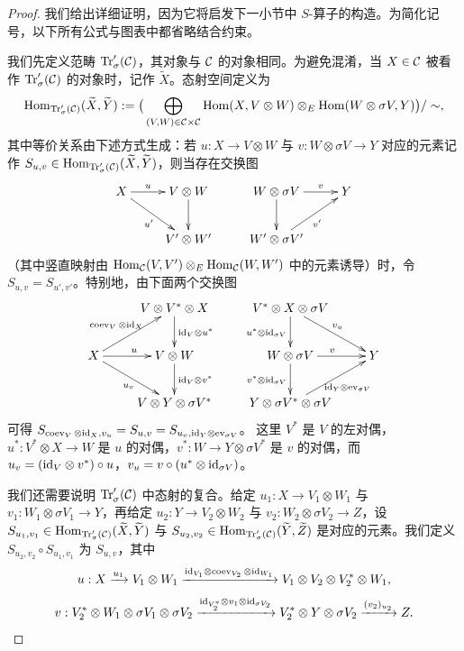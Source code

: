 \begin{proof}
我们给出详细证明，因为它将启发下一小节中 $S$-算子的构造。为简化记号，以下所有公式与图表中都省略结合约束。

我们先定义范畴 ${\operatorname{Tr}}'_\sigma({\mathcal C})$，其对象与 ${\mathcal C}$ 的对象相同。为避免混淆，当 $X\in{\mathcal C}$ 被看作 ${\operatorname{Tr}}'_\sigma({\mathcal C})$ 的对象时，记作 $\widetilde{X}$。态射空间定义为
\begin{equation*}
\label{E:trace hom}
{\operatorname{Hom}}_{{\operatorname{Tr}}'_\sigma({\mathcal C})}(\widetilde{X},\widetilde{Y}):=\big(\bigoplus_{(V,W)\in {\mathcal C}\times {\mathcal C}}{\operatorname{Hom}}(X, V\otimes W)\otimes_E {\operatorname{Hom}}(W\otimes \sigma V, Y)\big)/\sim,
\end{equation*}
其中等价关系由下述方式生成：若 $u: X\to V\otimes W$ 与 $v:W\otimes \sigma V\to Y$ 对应的元素记作 $S_{u,v}\in {\operatorname{Hom}}_{{\operatorname{Tr}}'_\sigma({\mathcal C})}(\widetilde{X},\widetilde{Y})$，则当存在交换图
\[\xymatrix{
X\ar^-{u}[r] \ar_{u'}[dr]& V\otimes W\ar[d] & W\otimes \sigma V\ar[d]\ar^-{v}[r] & Y\\
& V'\otimes W' & W'\otimes \sigma V'\ar_{v'}[ur] &
}\]
（其中竖直映射由 ${\operatorname{Hom}}_{\mathcal C}(V,V')\otimes_E{\operatorname{Hom}}_{{\mathcal C}}(W,W')$ 中的元素诱导）时，令 $S_{u,v}=S_{u',v'}$。特别地，由下面两个交换图
\begin{equation}
\label{E:frac}
\xymatrix{
&V\otimes V^*\otimes X\ar^{\id_V\otimes u^*}[d]& V^*\otimes X\otimes \sigma V\ar^{v_u}[dr]\ar_{u^*\otimes \id_{\sigma V}}[d]&\\
X\ar^{\coev_V\otimes\id_X}[ur]\ar^{u}[r]\ar_{u_v}[dr]&V\otimes W\ar^{\id_V\otimes v^*}[d]&W\otimes \sigma V\ar^{v}[r]\ar_{v^*\otimes\id_{\sigma V}}[d]& Y\\
&V\otimes Y\otimes \sigma V^*& Y\otimes \sigma V^*\otimes \sigma V\ar_{\id_Y\otimes\ev_{\sigma V}}[ur]&
}
\end{equation}
可得 $S_{\operatorname{coev}_V\otimes{\operatorname{id}}_X, v_u}=S_{u,v}=S_{u_v,{\operatorname{id}}_Y\otimes\operatorname{ev}_{\sigma V}}$。
这里 $V^*$ 是 $V$ 的左对偶，$u^*: V^*\otimes X\to W$ 是 $u$ 的对偶，$v^*:W\to Y\otimes \sigma V^*$ 是 $v$ 的对偶，而
$u_v= ({\operatorname{id}}_V\otimes v^*)\circ u$，$v_u= v\circ(u^*\otimes {\operatorname{id}}_{\sigma V})$。

我们还需要说明 ${\operatorname{Tr}}'_\sigma({\mathcal C})$ 中态射的复合。给定 $u_1: X\to V_1\otimes W_1$ 与 $v_1: W_1\otimes \sigma V_1\to Y$，再给定 $u_2: Y\to V_2\otimes W_2$ 与 $v_2: W_2\otimes \sigma V_2\to Z$，设 $S_{u_1,v_1}\in {\operatorname{Hom}}_{{\operatorname{Tr}}'_\sigma({\mathcal C})}(\widetilde{X},\widetilde{Y})$ 与 $S_{u_2,v_2}\in {\operatorname{Hom}}_{{\operatorname{Tr}}'_\sigma({\mathcal C})}(\widetilde{Y},\widetilde{Z})$ 是对应的元素。我们定义 $S_{u_2,v_2}\circ S_{u_1,v_1}$ 为 $S_{u,v}$，其中
\[u: X\xrightarrow{u_1} V_1\otimes W_1\xrightarrow{{\operatorname{id}}_{V_1}\otimes\operatorname{coev}_{V_2}\otimes{\operatorname{id}}_{W_1}}V_1\otimes V_2\otimes V^*_2\otimes W_1,\]
\[v: V^*_2\otimes W_1\otimes \sigma V_1\otimes \sigma V_2\xrightarrow{{\operatorname{id}}_{V^*_2}\otimes v_1\otimes{\operatorname{id}}_{\sigma V_2}}V^*_2\otimes Y\otimes \sigma V_2\xrightarrow{(v_2)_{u_2}} Z.\]


\end{proof}
